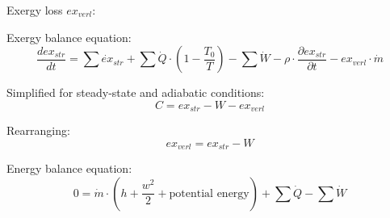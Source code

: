 Exergy loss \( ex_{verl} \):  

Exergy balance equation:  
\[
\frac{d ex_{str}}{dt} = \sum \dot{ex}_{str} + \sum \dot{Q} \cdot \left(1 - \frac{T_0}{T}\right) - \sum \dot{W} - \rho \cdot \frac{\partial ex_{str}}{\partial t} - ex_{verl} \cdot \dot{m}
\]  

Simplified for steady-state and adiabatic conditions:  
\[
C = ex_{str} - W - ex_{verl}
\]  

Rearranging:  
\[
ex_{verl} = ex_{str} - W
\]  

Energy balance equation:  
\[
0 = \dot{m} \cdot \left(h + \frac{w^2}{2} + \text{potential energy}\right) + \sum \dot{Q} - \sum \dot{W}
\]